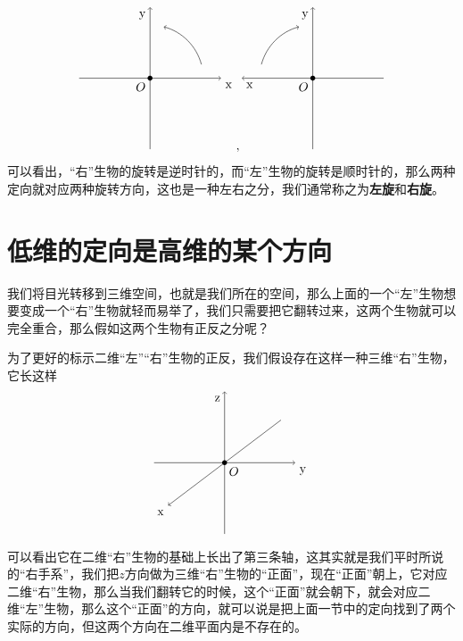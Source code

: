 \documentclass[hyperref,UTF8]{ctexart}
\begin{document}
\[
\begin{tikzpicture}
    \draw[->] (-2,0)--(2,0);
    \draw[->] (0,-2)--(0,2);
    \draw[->] (15:1.5) arc [start angle=15, end angle=75, radius=1.5cm];
    \fill (0,0) circle (2pt);
    \node[below left] (O) at (0,0) {$O$};
    \node[below right] (A) at (2,0) {$\text{x}$};
    \node[below left] (B) at (0,2) {$\text{y}$};
\end{tikzpicture},
\begin{tikzpicture}
    \draw[<-] (-2,0)--(2,0);
    \draw[->] (0,-2)--(0,2);
    \fill (0,0) circle (2pt);
    \draw[->] (165:1.5) arc [start angle=165, end angle=105, radius=1.5cm];
    \node[below left] (O) at (0,0) {$O$};
    \node[below right] (O) at (-2,0) {$\text{x}$};
    \node[below left] (O) at (0,2) {$\text{y}$};
\end{tikzpicture}
\]
可以看出，“右”生物的旋转是逆时针的，而“左”生物的旋转是顺时针的，那么两种定向就对应两种旋转方向，这也是一种左右之分，我们通常称之为\textbf{左旋}和\textbf{右旋}。
\section{低维的定向是高维的某个方向}
我们将目光转移到三维空间，也就是我们所在的空间，那么上面的一个“左”生物想要变成一个“右”生物就轻而易举了，我们只需要把它翻转过来，这两个生物就可以完全重合，那么假如这两个生物有正反之分呢？

为了更好的标示二维“左”“右”生物的正反，我们假设存在这样一种三维“右”生物，它长这样
\[
\begin{tikzpicture}
    \draw[->] (-2,0)--(2,0);
    \draw[->] (0,-2)--(0,2);
    \draw[->] (1.6,1.2)--(-1.6,-1.2);
    \fill (0,0) circle (2pt);
    \node[below right] (O) at (0,0) {$O$};
    \node[below right] (O) at (2,0) {$\text{y}$};
    \node[below left] (O) at (0,2) {$\text{z}$};
    \node[below left] (O) at (-1.6,-1.2) {$\text{x}$};
\end{tikzpicture}
\]
可以看出它在二维“右”生物的基础上长出了第三条轴，这其实就是我们平时所说的“右手系”，我们把$z$方向做为三维“右”生物的“正面”，现在“正面”朝上，它对应二维“右”生物，那么当我们翻转它的时候，这个“正面”就会朝下，就会对应二维“左”生物，那么这个“正面”的方向，就可以说是把上面一节中的定向找到了两个实际的方向，但这两个方向在二维平面内是不存在的。
\end{document}
